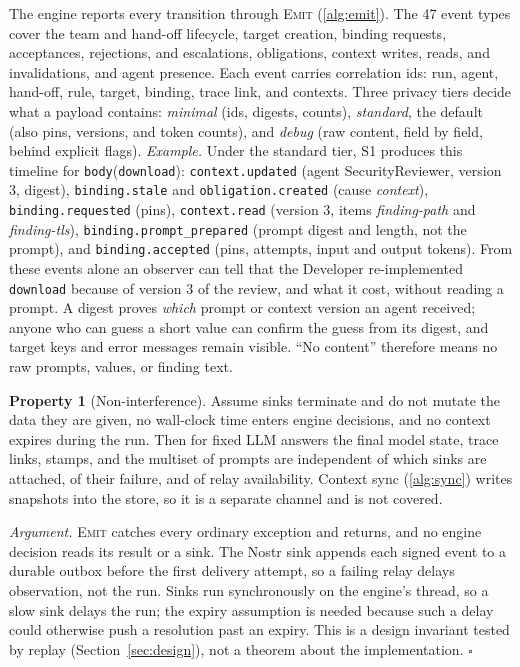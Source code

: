 \documentclass[10pt,conference]{IEEEtran}
\theoremstyle{definition}
\newtheorem{proposition}{Property}
\newcommand{\code}[1]{\texttt{#1}}
\begin{document}
The engine reports every transition through \textsc{Emit} (\cref{alg:emit}). The 47 event types cover the
team and hand-off lifecycle, target creation, binding requests, acceptances, rejections, and escalations,
obligations, context writes, reads, and invalidations, and agent presence. Each event carries correlation ids:
run, agent, hand-off, rule, target, binding, trace link, and contexts. Three privacy tiers decide what a
payload contains: \emph{minimal} (ids, digests, counts), \emph{standard}, the default (also pins, versions, and
token counts), and \emph{debug} (raw content, field by field, behind explicit flags). \emph{Example.} Under the
standard tier, S1 produces this timeline for \code{body}(\code{download}): \code{context.updated} (agent
SecurityReviewer, version 3, digest), \code{binding.stale} and \code{obligation.created} (cause
\emph{context}), \code{binding.requested} (pins), \code{context.read} (version 3, items \emph{finding-path} and
\emph{finding-tls}), \code{binding.prompt\_prepared} (prompt digest and length, not the prompt), and
\code{binding.accepted} (pins, attempts, input and output tokens). From these events alone an observer can
tell that the Developer re-implemented \code{download} because of version 3 of the review, and what it cost,
without reading a prompt. A digest proves \emph{which} prompt or context version an agent received; anyone
who can guess a short value can confirm the guess from its digest, and target keys and error messages remain
visible. ``No content'' therefore means no raw prompts, values, or finding text.

\begin{proposition}[Non-interference]\label{prop:noninterf}
Assume sinks terminate and do not mutate the data they are given, no wall-clock time enters engine decisions,
and no context expires during the run. Then for fixed LLM answers the final model state, trace links, stamps,
and the multiset of prompts are independent of which sinks are attached, of their failure, and of relay
availability. Context sync (\cref{alg:sync}) writes snapshots into the store, so it is a separate channel and
is not covered.
\end{proposition}
\noindent\emph{Argument.} \textsc{Emit} catches every ordinary exception and returns, and no engine decision
reads its result or a sink. The Nostr sink appends each signed event to a durable outbox before the first
delivery attempt, so a failing relay delays observation, not the run. Sinks run synchronously on the engine's
thread, so a slow sink delays the run; the expiry assumption is needed because such a delay could otherwise
push a resolution past an expiry. This is a design invariant tested by replay (Section~\ref{sec:design}),
not a theorem about the implementation. \hfill$\square$
\end{document}
